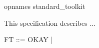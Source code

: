 \documentclass{article}
\begin{document}
\begin{zsection}
  \SECTION opnames \parents standard\_toolkit
\end{zsection}

This specification describes ...


\begin{zed}
   FT ::= OKAY | \bot
\end{zed}
\end{document}
